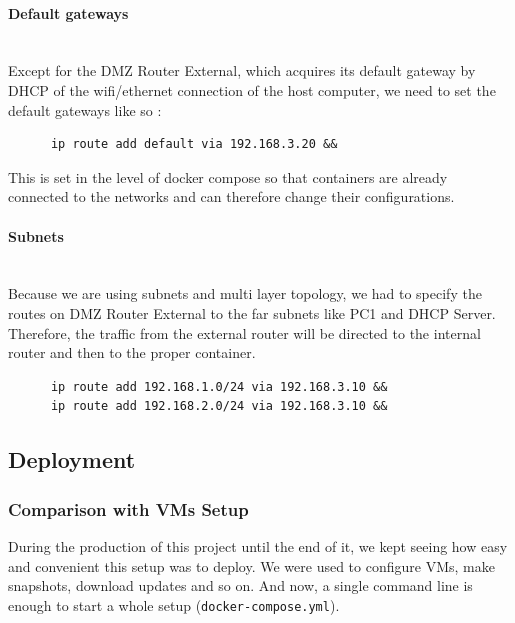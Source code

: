 \documentclass[a4paper,11pt,singlespacing]{article}
\begin{document}
\paragraph{Default gateways}
\leavevmode\\
Except for the DMZ Router External, which acquires its default gateway by DHCP of the wifi/ethernet connection of the host computer, we need to set the default gateways like so :
\begin{lstlisting}
      ip route add default via 192.168.3.20 &&
\end{lstlisting}

This is set in the level of docker compose so that containers are already connected to the networks and can therefore change their configurations.

\paragraph{Subnets}
\leavevmode\\
Because we are using subnets and multi layer topology, we had to specify the routes on DMZ Router External to the far subnets like PC1 and DHCP Server. Therefore, the traffic from the external router will be directed to the internal router and then to the proper container.
\begin{lstlisting}
      ip route add 192.168.1.0/24 via 192.168.3.10 &&
      ip route add 192.168.2.0/24 via 192.168.3.10 &&
\end{lstlisting}

\subsection{Deployment}

\subsubsection{Comparison with VMs Setup}
During the production of this project until the end of it, we kept seeing how easy and convenient this setup was to deploy. We were used to configure VMs, make snapshots, download updates and so on. And now, a single command line is enough to start a whole setup (\texttt{docker-compose.yml}).\\
\end{document}
